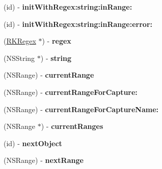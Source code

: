 \begin{DoxyCompactItemize}
\item 
\hypertarget{interface_r_k_enumerator_ad1bad36f2d3bd3eba6de33fcafaf8e7b}{(id) -\/ {\bfseries init\-With\-Regex\-:string\-:in\-Range\-:}}\label{interface_r_k_enumerator_ad1bad36f2d3bd3eba6de33fcafaf8e7b}

\item 
\hypertarget{interface_r_k_enumerator_a4f1db961c794b75d4317c4a8e8208051}{(id) -\/ {\bfseries init\-With\-Regex\-:string\-:in\-Range\-:error\-:}}\label{interface_r_k_enumerator_a4f1db961c794b75d4317c4a8e8208051}

\item 
\hypertarget{interface_r_k_enumerator_ac308ce07de2295cc25e79ba95e8d1dee}{(\hyperlink{interface_r_k_regex}{R\-K\-Regex} $\ast$) -\/ {\bfseries regex}}\label{interface_r_k_enumerator_ac308ce07de2295cc25e79ba95e8d1dee}

\item 
\hypertarget{interface_r_k_enumerator_a65957082b543324f052a437183733b03}{(N\-S\-String $\ast$) -\/ {\bfseries string}}\label{interface_r_k_enumerator_a65957082b543324f052a437183733b03}

\item 
\hypertarget{interface_r_k_enumerator_ae5528582796723abbb37baca026f43e8}{(N\-S\-Range) -\/ {\bfseries current\-Range}}\label{interface_r_k_enumerator_ae5528582796723abbb37baca026f43e8}

\item 
\hypertarget{interface_r_k_enumerator_afcf75c6d91df537643c95fa25a66de92}{(N\-S\-Range) -\/ {\bfseries current\-Range\-For\-Capture\-:}}\label{interface_r_k_enumerator_afcf75c6d91df537643c95fa25a66de92}

\item 
\hypertarget{interface_r_k_enumerator_a0495dff66d2fb56a77565dfc394d3ec0}{(N\-S\-Range) -\/ {\bfseries current\-Range\-For\-Capture\-Name\-:}}\label{interface_r_k_enumerator_a0495dff66d2fb56a77565dfc394d3ec0}

\item 
\hypertarget{interface_r_k_enumerator_a7dbff5d0073d593ce26461924da6d781}{(N\-S\-Range $\ast$) -\/ {\bfseries current\-Ranges}}\label{interface_r_k_enumerator_a7dbff5d0073d593ce26461924da6d781}

\item 
\hypertarget{interface_r_k_enumerator_a61ed4826271f0a4b28442c3068938cb4}{(id) -\/ {\bfseries next\-Object}}\label{interface_r_k_enumerator_a61ed4826271f0a4b28442c3068938cb4}

\item 
\hypertarget{interface_r_k_enumerator_a91fbeeac55fb651ff57d2dde85dda012}{(N\-S\-Range) -\/ {\bfseries next\-Range}}\label{interface_r_k_enumerator_a91fbeeac55fb651ff57d2dde85dda012}


\end{DoxyCompactItemize}
